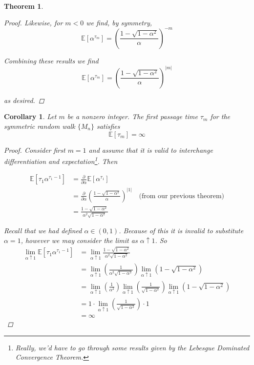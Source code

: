 \documentclass[12pt]{article}
\newtheorem{corollary}{Corollary}
\newtheorem{theorem}{Theorem}
\newlength\tindent
\renewcommand{\indent}{\hspace*{\tindent}}
\newcommand{\E}{\mathbb E}
\begin{document}
\begin{theorem}
\begin{proof}
Likewise, for $m < 0$ we find, by symmetry,
\begin{equation*}
	\E \left[\alpha^{\tau_m} \right] = \left( \frac{1 - \sqrt{1 - \alpha^2}}{\alpha} \right)^{-m}
\end{equation*}

Combining these results we find
\begin{equation*}
	\E \left[\alpha^{\tau_m} \right] = \left( \frac{1 - \sqrt{1 - \alpha^2}}{\alpha} \right)^{|m|}
\end{equation*}

as desired.
\end{proof}
\end{theorem}

\begin{corollary} Let $m$ be a nonzero integer. The first passage time $\tau_m$ for the symmetric random walk $\{M_n\}$ satisfies
\begin{equation*}
	\E[\tau_m] = \infty
\end{equation*}

\begin{proof} Consider first $m = 1$ and assume that it is valid to interchange differentiation and expectation\footnote{Really, we'd have to go through some results given by the Lebesgue Dominated Convergence Theorem.}. Then

\begin{align*}
	\E \left[ \tau_1 \alpha^{\tau_1 - 1} \right] &= \frac{\partial}{\partial\alpha} \E \left[ \alpha^{\tau_1} \right] \\
	&= \frac{\partial}{\partial\alpha} \left( \frac{1 - \sqrt{1 - \alpha^2}}{\alpha} \right)^{|1|} \quad \text{(from our previous theorem)} \\
	&= \frac{ 1 - \sqrt{1 - \alpha^2} }{ \alpha^2\sqrt{1 - \alpha^2} }
\end{align*}

\indent Recall that we had defined $\alpha \in (0,1)$. Because of this it is invalid to substitute $\alpha = 1$, however we may consider the limit as $\alpha\uparrow 1$. So
\begin{align*}
	\lim_{\alpha\uparrow 1} \E \left[ \tau_1 \alpha^{\tau_1 - 1} \right] &= \lim_{\alpha\uparrow 1} \frac{ 1 - \sqrt{1 - \alpha^2} }{ \alpha^2\sqrt{1 - \alpha^2} } \\
	&= \lim_{\alpha\uparrow 1} \left( \frac{1}{\alpha^2\sqrt{1 - \alpha^2}} \right) \lim_{\alpha\uparrow 1} \left( 1 - \sqrt{1 - \alpha^2} \right) \\
	&= \lim_{\alpha\uparrow 1}\left( \frac{1}{\alpha^2} \right) \lim_{\alpha\uparrow 1} \left( \frac{1}{\sqrt{1 - \alpha^2}} \right) \lim_{\alpha\uparrow 1} \left( 1 - \sqrt{1 - \alpha^2} \right) \\
	&= 1 \cdot  \lim_{\alpha\uparrow 1} \left( \frac{1}{\sqrt{1 - \alpha^2}} \right) \cdot 1 \\
	&= \infty
\end{align*}


\end{proof}
\end{corollary}
\end{document}
